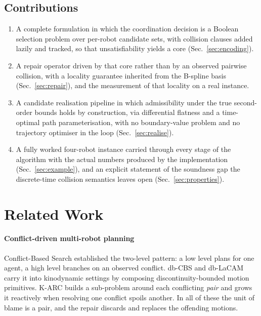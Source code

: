 \documentclass[conference]{IEEEtran}
\begin{document}
\subsection*{Contributions}

\begin{enumerate}
  \item A complete formulation in which the coordination decision is a Boolean selection
        problem over per-robot candidate sets, with collision clauses added lazily and
        tracked, so that unsatisfiability yields a core (Sec.~\ref{sec:encoding}).
  \item A repair operator driven by that core rather than by an observed pairwise
        collision, with a locality guarantee inherited from the B-spline basis
        (Sec.~\ref{sec:repair}), and the measurement of that locality on a real instance.
  \item A candidate realisation pipeline in which admissibility under the true
        second-order bounds holds by construction, via differential flatness and a
        time-optimal path parameterisation, with no boundary-value problem and no
        trajectory optimiser in the loop (Sec.~\ref{sec:realise}).
  \item A fully worked four-robot instance carried through every stage of the algorithm
        with the actual numbers produced by the implementation (Sec.~\ref{sec:example}),
        and an explicit statement of the soundness gap the discrete-time collision
        semantics leaves open (Sec.~\ref{sec:properties}).
\end{enumerate}

\section{Related Work}

\paragraph*{Conflict-driven multi-robot planning}
Conflict-Based Search \cite{cbs2015} established the two-level pattern: a low level plans
for one agent, a high level branches on an observed conflict. db-CBS \cite{dbcbs2024} and
db-LaCAM \cite{dblacam2025} carry it into kinodynamic settings by composing
discontinuity-bounded motion primitives. K-ARC \cite{karc2025} builds a sub-problem around
each conflicting \emph{pair} and grows it reactively when resolving one conflict spoils
another. In all of these the unit of blame is a pair, and the repair discards and replaces
the offending motions.
\end{document}
